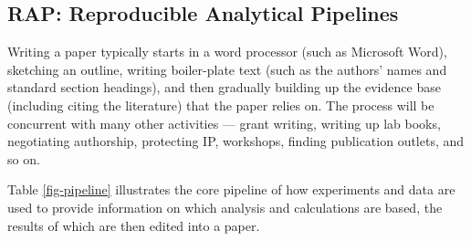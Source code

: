 \documentclass{comjnl}
\begin{document}
\subsection{RAP: Reproducible Analytical Pipelines}\label{RAP-section}
Writing a paper typically starts in a word processor (such as Microsoft Word), sketching an outline, writing boiler-plate text (such as the authors' names and standard section headings), and then gradually building up the evidence base (including citing the literature) that the paper relies on. The process will be concurrent with many other activities --- grant writing, writing up lab books, negotiating authorship, protecting IP, workshops, finding publication outlets, and so on.

Table \ref{fig-pipeline} illustrates the core pipeline of how experiments and data are used to provide information on which analysis and calculations are based, the results of which are then edited into a paper.
\end{document}
